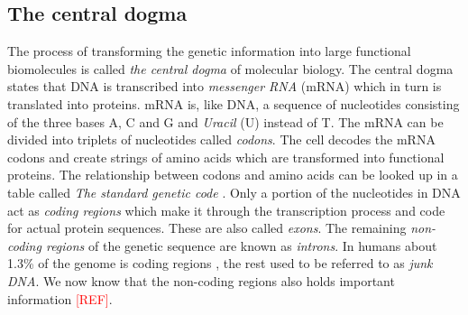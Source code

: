 \documentclass[thesis.tex]{subfiles}
\begin{document}
\subsection{The central dogma}
The process of transforming the genetic information into large functional biomolecules is called \textit{the central dogma} of molecular biology. The central dogma states that DNA is transcribed into \textit{messenger RNA} (mRNA) which in turn is translated into proteins. mRNA is, like DNA, a sequence of nucleotides consisting of the three bases A, C and G and \textit{Uracil} (U) instead of T. The mRNA can be divided into triplets of nucleotides called \textit{codons}. The cell decodes the mRNA codons and create strings of amino acids which are transformed into functional proteins. The relationship between codons and amino acids can be looked up in a table called \textit{The standard genetic code} \cite[Chapter 1, p. 6]{introduction_to_genomics}. Only a portion of the nucleotides in DNA act as \textit{coding regions} which make it through the transcription process and code for actual protein sequences. These are also called \textit{exons}. The remaining \textit{non-coding regions} of the genetic sequence are known as \textit{introns}. In humans about 1.3\% of the genome is coding regions \cite[Chapter 4]{introduction_to_genomics}, the rest used to be referred to as \textit{junk DNA}. We now know that the non-coding regions also holds important information \textcolor{red}{[REF]}.
\end{document}
